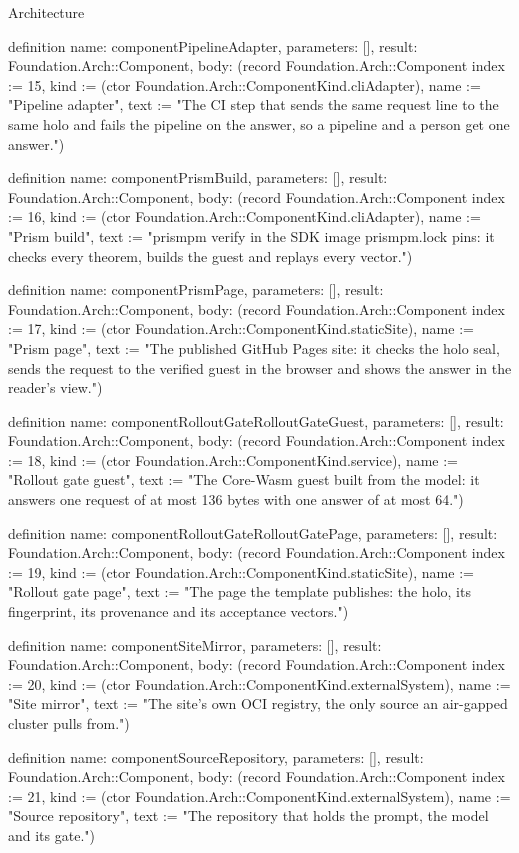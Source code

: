 \begin{lexlean}{Architecture}
\begin{semanticmodule}
definition{
  name: componentPipelineAdapter,
  parameters: [],
  result: Foundation.Arch::Component,
  body: (record Foundation.Arch::Component {index := 15, kind := (ctor Foundation.Arch::ComponentKind.cliAdapter), name := "Pipeline adapter", text := "The CI step that sends the same request line to the same holo and fails the pipeline on the answer, so a pipeline and a person get one answer."})
}

definition{
  name: componentPrismBuild,
  parameters: [],
  result: Foundation.Arch::Component,
  body: (record Foundation.Arch::Component {index := 16, kind := (ctor Foundation.Arch::ComponentKind.cliAdapter), name := "Prism build", text := "prismpm verify in the SDK image prismpm.lock pins: it checks every theorem, builds the guest and replays every vector."})
}

definition{
  name: componentPrismPage,
  parameters: [],
  result: Foundation.Arch::Component,
  body: (record Foundation.Arch::Component {index := 17, kind := (ctor Foundation.Arch::ComponentKind.staticSite), name := "Prism page", text := "The published GitHub Pages site: it checks the holo seal, sends the request to the verified guest in the browser and shows the answer in the reader's view."})
}

definition{
  name: componentRolloutGateRolloutGateGuest,
  parameters: [],
  result: Foundation.Arch::Component,
  body: (record Foundation.Arch::Component {index := 18, kind := (ctor Foundation.Arch::ComponentKind.service), name := "Rollout gate guest", text := "The Core-Wasm guest built from the model: it answers one request of at most 136 bytes with one answer of at most 64."})
}

definition{
  name: componentRolloutGateRolloutGatePage,
  parameters: [],
  result: Foundation.Arch::Component,
  body: (record Foundation.Arch::Component {index := 19, kind := (ctor Foundation.Arch::ComponentKind.staticSite), name := "Rollout gate page", text := "The page the template publishes: the holo, its fingerprint, its provenance and its acceptance vectors."})
}

definition{
  name: componentSiteMirror,
  parameters: [],
  result: Foundation.Arch::Component,
  body: (record Foundation.Arch::Component {index := 20, kind := (ctor Foundation.Arch::ComponentKind.externalSystem), name := "Site mirror", text := "The site's own OCI registry, the only source an air-gapped cluster pulls from."})
}

definition{
  name: componentSourceRepository,
  parameters: [],
  result: Foundation.Arch::Component,
  body: (record Foundation.Arch::Component {index := 21, kind := (ctor Foundation.Arch::ComponentKind.externalSystem), name := "Source repository", text := "The repository that holds the prompt, the model and its gate."})
}


\end{semanticmodule}
\end{lexlean}
